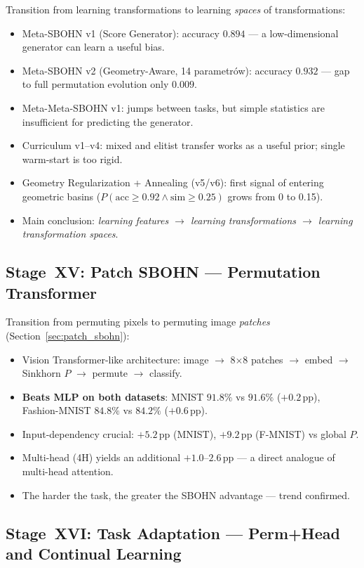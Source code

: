 \documentclass[11pt,a4paper]{report}
\begin{document}
Transition from learning transformations to learning \emph{spaces} of transformations:
\begin{itemize}
\item Meta-SBOHN v1 (Score Generator): accuracy $0.894$ --- a low-dimensional generator can learn a useful bias.
\item Meta-SBOHN v2 (Geometry-Aware, 14 parametrów): accuracy $0.932$ --- gap to full permutation evolution only $0.009$.
\item Meta-Meta-SBOHN v1: jumps between tasks, but simple statistics are insufficient for predicting the generator.
\item Curriculum v1--v4: mixed and elitist transfer works as a useful prior; single warm-start is too rigid.
\item Geometry Regularization + Annealing (v5/v6): first signal of entering geometric basins ($P(\mathrm{acc}\ge 0.92 \wedge \mathrm{sim}\ge 0.25)$ grows from 0 to 0.15).
\item Main conclusion: \emph{learning features $\to$ learning transformations $\to$ learning transformation spaces}.
\end{itemize}

\subsection{Stage~XV: Patch SBOHN --- Permutation Transformer}

Transition from permuting pixels to permuting image \emph{patches} (Section~\ref{sec:patch_sbohn}):
\begin{itemize}
\item Vision Transformer-like architecture: image $\to$ 8$\times$8 patches $\to$ embed $\to$ Sinkhorn $P$ $\to$ permute $\to$ classify.
\item \textbf{Beats MLP on both datasets}: MNIST $91.8\%$ vs $91.6\%$ ($+0.2$\,pp), Fashion-MNIST $84.8\%$ vs $84.2\%$ ($+0.6$\,pp).
\item Input-dependency crucial: $+5.2$\,pp (MNIST), $+9.2$\,pp (F-MNIST) vs global $P$.
\item Multi-head (4H) yields an additional $+1.0$--$2.6$\,pp --- a direct analogue of multi-head attention.
\item The harder the task, the greater the SBOHN advantage --- trend confirmed.
\end{itemize}


\subsection{Stage~XVI: Task Adaptation --- Perm+Head and Continual Learning}
\end{document}
